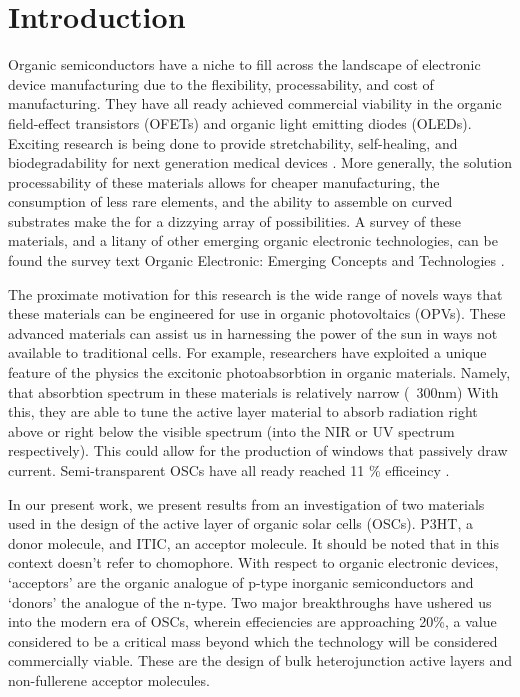 \chapter{Introduction} 
Organic semiconductors have a niche to fill across the landscape of electronic
device manufacturing due to the flexibility, processability, and cost of manufacturing. They have all ready
achieved commercial viability in the organic field-effect transistors (OFETs) and organic light emitting
diodes (OLEDs).
Exciting research is being done to provide stretchability, self-healing, and biodegradability for 
next generation medical devices \cite{Brutting2006}.
More generally, the solution processability of these materials allows for
cheaper manufacturing, the consumption of less rare elements, and the ability to assemble on curved substrates make the for a dizzying array of possibilities. A survey of these materials, and a litany of
other emerging organic electronic technologies, can be found the survey text 
Organic Electronic: Emerging Concepts and Technologies
\cite{FabioCicoiraEditor2013}. 

The proximate motivation for this research is the wide range of novels ways that these materials can be
engineered for use in organic photovoltaics (OPVs). These advanced materials
can assist us in harnessing the power of the sun in ways not available to traditional cells. 
For example, researchers have exploited a unique feature of the physics the excitonic photoabsorbtion in 
organic materials.  Namely, that absorbtion spectrum
in these materials is relatively narrow (~300nm)
With this, they are able to tune the active layer material to absorb radiation right above or right below the
visible spectrum (into the NIR or UV spectrum respectively). This 
could allow for the production of windows that passively draw current. Semi-transparent OSCs have all ready
reached 11 \% efficeincy \cite{Brabec2020}. 

In our present work, we present results from an investigation of two materials
used in the design of the active layer of organic solar cells (OSCs). P3HT, a
donor molecule, and ITIC, an acceptor molecule. 
It should be noted that  in this context doesn't refer to
chomophore. With respect to organic electronic devices, `acceptors' are the
organic analogue of p-type inorganic semiconductors and `donors' the analogue of the n-type. 
Two major breakthroughs have ushered us into the modern era of OSCs, wherein effeciencies are approaching 20\%,
a value considered to be a critical mass beyond which the technology will be considered commercially viable.
These are the design of bulk heterojunction active layers and non-fullerene acceptor molecules. 

